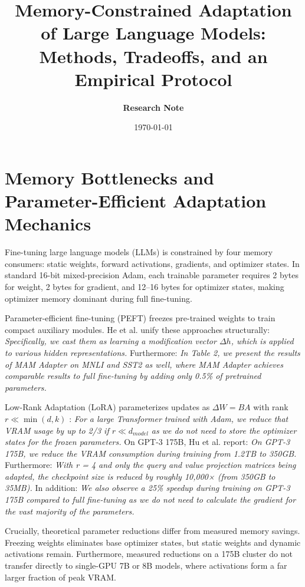 \documentclass[11pt,a4paper]{article}
\title{\textbf{Memory-Constrained Adaptation of Large Language Models:\\Methods, Tradeoffs, and an Empirical Protocol}}
\author{\textbf{Research Note}}
\date{\today}
\begin{document}
\maketitle

\section{Memory Bottlenecks and Parameter-Efficient Adaptation Mechanics}

Fine-tuning large language models (LLMs) is constrained by four memory consumers: static weights, forward activations, gradients, and optimizer states. In standard 16-bit mixed-precision Adam, each trainable parameter requires 2 bytes for weight, 2 bytes for gradient, and 12--16 bytes for optimizer states, making optimizer memory dominant during full fine-tuning.

Parameter-efficient fine-tuning (PEFT) freezes pre-trained weights to train compact auxiliary modules. He et al. unify these approaches structurally: \textit{Specifically, we cast them as learning a modification vector $\Delta h$, which is applied to various hidden representations.} \cite{he2021unified} Furthermore: \textit{In Table 2, we present the results of MAM Adapter on MNLI and SST2 as well, where MAM Adapter achieves comparable results to full fine-tuning by adding only 0.5\% of pretrained parameters.} \cite{he2021unified}

Low-Rank Adaptation (LoRA) parameterizes updates as $\Delta W = B A$ with rank $r \ll \min(d, k)$ \cite{hu2021lora}: \textit{For a large Transformer trained with Adam, we reduce that VRAM usage by up to 2/3 if $r \ll d_{model}$ as we do not need to store the optimizer states for the frozen parameters.} \cite{hu2021lora} On GPT-3 175B, Hu et al. report: \textit{On GPT-3 175B, we reduce the VRAM consumption during training from 1.2TB to 350GB.} \cite{hu2021lora} Furthermore: \textit{With r = 4 and only the query and value projection matrices being adapted, the checkpoint size is reduced by roughly 10,000× (from 350GB to 35MB).} \cite{hu2021lora} In addition: \textit{We also observe a 25\% speedup during training on GPT-3 175B compared to full fine-tuning as we do not need to calculate the gradient for the vast majority of the parameters.} \cite{hu2021lora}

Crucially, theoretical parameter reductions differ from measured memory savings. Freezing weights eliminates base optimizer states, but static weights and dynamic activations remain. Furthermore, measured reductions on a 175B cluster do not transfer directly to single-GPU 7B or 8B models, where activations form a far larger fraction of peak VRAM.
\end{document}
